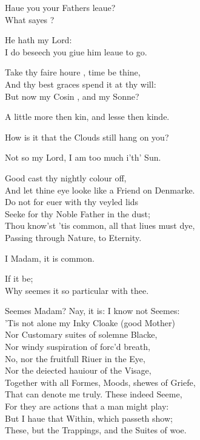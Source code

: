 \documentclass[a5paper,DIV=calc,11pt]{scrbook}
\begin{document}
\begin{drama*}
    \kingspeaks Haue you your Fathers leaue?\\
    What sayes \pol?
    
    \polspeaks He hath my Lord:\\
    I do beseech you giue him leaue to go.
    
    \kingspeaks Take thy faire houre \laer, time be thine,\\
    And thy best graces spend it at thy will:\\
    But now my Cosin \ham, and my Sonne?
    
    \hamspeaks A little more then kin, and lesse then kinde.
    
    \kingspeaks How is it that the Clouds still hang on you?
    
    \hamspeaks Not so my Lord, I am too much i'th' Sun.
    
    \queenspeaks Good \ham cast thy nightly colour off,\\
    And let thine eye looke like a Friend on Denmarke.\\
    Do not for euer with thy veyled lids\\
    Seeke for thy Noble Father in the dust;\\
    Thou know'st 'tis common, all that liues must dye,\\
    Passing through Nature, to Eternity.
    
    \hamspeaks I Madam, it is common.
    
    \queenspeaks If it be;\\
    Why seemes it so particular with thee.
    
    \hamspeaks Seemes Madam? Nay, it is: I know not Seemes:\\
    'Tis not alone my Inky Cloake (good Mother)\\
    Nor Customary suites of solemne Blacke,\\
    Nor windy suspiration of forc'd breath,\\
    No, nor the fruitfull Riuer in the Eye,\\
    Nor the deiected hauiour of the Visage,\\
    Together with all Formes, Moods, shewes of Griefe,\\
    That can denote me truly. These indeed Seeme,\\
    For they are actions that a man might play:\\
    But I haue that Within, which passeth show;\\
    These, but the Trappings, and the Suites of woe.
    

\end{drama*}
\end{document}
